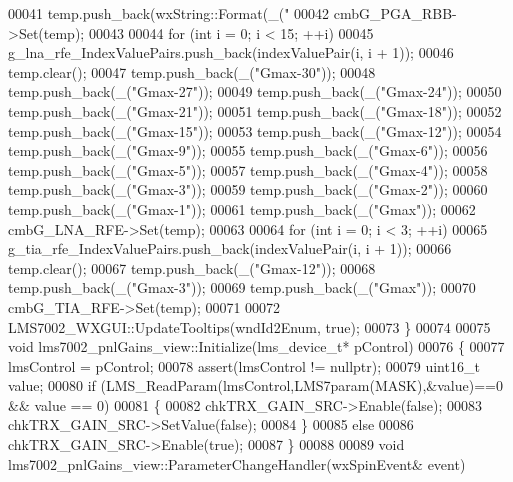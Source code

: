 \begin{DoxyCode}
{00041         temp.push\_back(wxString::Format(\_(\textcolor{stringliteral}{"%
00042     cmbG_PGA_RBB->Set(temp);
00043 
00044     \textcolor{keywordflow}{for} (\textcolor{keywordtype}{int} i = 0; i < 15; ++i)
00045         g_lna_rfe_IndexValuePairs.push\_back(indexValuePair(i, i + 1));
00046     temp.clear();
00047     temp.push\_back(\_(\textcolor{stringliteral}{"Gmax-30"}));
00048     temp.push\_back(\_(\textcolor{stringliteral}{"Gmax-27"}));
00049     temp.push\_back(\_(\textcolor{stringliteral}{"Gmax-24"}));
00050     temp.push\_back(\_(\textcolor{stringliteral}{"Gmax-21"}));
00051     temp.push\_back(\_(\textcolor{stringliteral}{"Gmax-18"}));
00052     temp.push\_back(\_(\textcolor{stringliteral}{"Gmax-15"}));
00053     temp.push\_back(\_(\textcolor{stringliteral}{"Gmax-12"}));
00054     temp.push\_back(\_(\textcolor{stringliteral}{"Gmax-9"}));
00055     temp.push\_back(\_(\textcolor{stringliteral}{"Gmax-6"}));
00056     temp.push\_back(\_(\textcolor{stringliteral}{"Gmax-5"}));
00057     temp.push\_back(\_(\textcolor{stringliteral}{"Gmax-4"}));
00058     temp.push\_back(\_(\textcolor{stringliteral}{"Gmax-3"}));
00059     temp.push\_back(\_(\textcolor{stringliteral}{"Gmax-2"}));
00060     temp.push\_back(\_(\textcolor{stringliteral}{"Gmax-1"}));
00061     temp.push\_back(\_(\textcolor{stringliteral}{"Gmax"}));
00062     cmbG_LNA_RFE->Set(temp);
00063 
00064     \textcolor{keywordflow}{for} (\textcolor{keywordtype}{int} i = 0; i < 3; ++i)
00065         g_tia_rfe_IndexValuePairs.push\_back(indexValuePair(i, i + 1));
00066     temp.clear();
00067     temp.push\_back(\_(\textcolor{stringliteral}{"Gmax-12"}));
00068     temp.push\_back(\_(\textcolor{stringliteral}{"Gmax-3"}));
00069     temp.push\_back(\_(\textcolor{stringliteral}{"Gmax"}));
00070     cmbG_TIA_RFE->Set(temp);
00071 
00072     LMS7002_WXGUI::UpdateTooltips(wndId2Enum, \textcolor{keyword}{true});
00073 \}
00074 
00075 \textcolor{keywordtype}{void} lms7002_pnlGains_view::Initialize(lms_device_t* pControl)
00076 \{
00077     lmsControl = pControl;
00078     assert(lmsControl != \textcolor{keyword}{nullptr});
00079     uint16\_t value;
00080     \textcolor{keywordflow}{if} (LMS_ReadParam(lmsControl,LMS7param(MASK),&value)==0 && value == 0)
00081     \{
00082         chkTRX_GAIN_SRC->Enable(\textcolor{keyword}{false});
00083         chkTRX_GAIN_SRC->SetValue(\textcolor{keyword}{false});
00084     \}
00085     \textcolor{keywordflow}{else}
00086         chkTRX_GAIN_SRC->Enable(\textcolor{keyword}{true});
00087 \}
00088 
00089 \textcolor{keywordtype}{void} lms7002_pnlGains_view::ParameterChangeHandler(wxSpinEvent& event)
}}
\end{DoxyCode}
